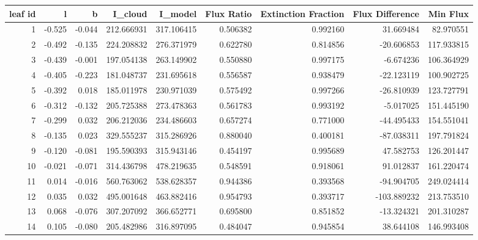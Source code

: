 \begin{tabular}{rrrrrrrrr}
\toprule
 leaf id &      l &      b &     I\_cloud &     I\_model &  Flux Ratio &  Extinction Fraction &  Flux Difference &    Min Flux \\
\midrule
       1 & -0.525 & -0.044 &  212.666931 &  317.106415 &    0.506382 &             0.992160 &        31.669484 &   82.970551 \\
       2 & -0.492 & -0.135 &  224.208832 &  276.371979 &    0.622780 &             0.814856 &       -20.606853 &  117.933815 \\
       3 & -0.439 & -0.001 &  197.054138 &  263.149902 &    0.550880 &             0.997175 &        -6.674236 &  106.364929 \\
       4 & -0.405 & -0.223 &  181.048737 &  231.695618 &    0.556587 &             0.938479 &       -22.123119 &  100.902725 \\
       5 & -0.392 &  0.018 &  185.011978 &  230.971039 &    0.575492 &             0.997266 &       -26.810939 &  123.727791 \\
       6 & -0.312 & -0.132 &  205.725388 &  273.478363 &    0.561783 &             0.993192 &        -5.017025 &  151.445190 \\
       7 & -0.299 &  0.032 &  206.212036 &  234.486603 &    0.657274 &             0.771000 &       -44.495433 &  154.551041 \\
       8 & -0.135 &  0.023 &  329.555237 &  315.286926 &    0.880040 &             0.400181 &       -87.038311 &  197.791824 \\
       9 & -0.120 & -0.081 &  195.590393 &  315.943146 &    0.454197 &             0.995689 &        47.582753 &  126.201447 \\
      10 & -0.021 & -0.071 &  314.436798 &  478.219635 &    0.548591 &             0.918061 &        91.012837 &  161.220474 \\
      11 &  0.014 & -0.016 &  560.763062 &  538.628357 &    0.944386 &             0.393568 &       -94.904705 &  249.024414 \\
      12 &  0.035 &  0.032 &  495.001648 &  463.882416 &    0.954793 &             0.393717 &      -103.889232 &  213.753510 \\
      13 &  0.068 & -0.076 &  307.207092 &  366.652771 &    0.695800 &             0.851852 &       -13.324321 &  201.310287 \\
      14 &  0.105 & -0.080 &  205.482986 &  316.897095 &    0.484047 &             0.945854 &        38.644108 &  146.993408 \\

\end{tabular}

